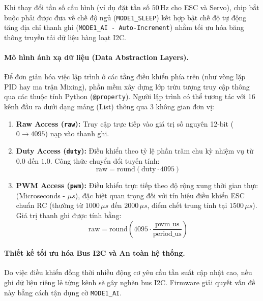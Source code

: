 \documentclass[../DoAn.tex]{subfiles}
\begin{document}
Khi thay đổi tần số cấu hình (ví dụ đặt tần số $50\,\text{Hz}$ cho ESC và Servo), chip bắt buộc phải được đưa về chế độ ngủ (\texttt{MODE1\_SLEEP}) kết hợp bật chế độ tự động tăng địa chỉ thanh ghi (\texttt{MODE1\_AI - Auto-Increment}) nhằm tối ưu hóa băng thông truyền tải dữ liệu hàng loạt I2C.

\paragraph{Mô hình ánh xạ dữ liệu (Data Abstraction Layers).}

Để đơn giản hóa việc lập trình ở các tầng điều khiển phía trên (như vòng lặp PID hay ma trận Mixing), phần mềm xây dựng lớp trừu tượng truy cập thông qua các thuộc tính Python (\texttt{@property}). Người lập trình có thể tương tác với 16 kênh đầu ra dưới dạng mảng (List) thông qua 3 không gian đơn vị:
\begin{enumerate}
    \item \textbf{Raw Access (\texttt{raw}):} Truy cập trực tiếp vào giá trị số nguyên 12-bit ($0 \to 4095$) nạp vào thanh ghi.
    \item \textbf{Duty Access (\texttt{duty}):} Điều khiển theo tỷ lệ phần trăm chu kỳ nhiệm vụ từ $0.0$ đến $1.0$. Công thức chuyển đổi tuyến tính:
    \begin{equation}
        \text{raw} = \text{round}(\text{duty} \cdot 4095)
    \end{equation}
    \item \textbf{PWM Access (\texttt{pwm}):} Điều khiển trực tiếp theo độ rộng xung thời gian thực (Microseconds - $\mu s$), đặc biệt quan trọng đối với tín hiệu điều khiển ESC chuẩn RC (thường từ $1000\,\mu s$ đến $2000\,\mu s$, điểm chết trung tính tại $1500\,\mu s$). Giá trị thanh ghi được tính bằng:
    \begin{equation}
        \text{raw} = \text{round}\left( 4095 \cdot \frac{\text{pwm\_us}}{\text{period\_us}} \right)
    \end{equation}
\end{enumerate}

\paragraph{Thiết kế tối ưu hóa Bus I2C và An toàn hệ thống.}

Do việc điều khiển đồng thời nhiều động cơ yêu cầu tần suất cập nhật cao, nếu ghi dữ liệu riêng lẻ từng kênh sẽ gây nghẽn bus I2C. Firmware giải quyết vấn đề này bằng cách tận dụng cờ \texttt{MODE1\_AI}. 
\end{document}
